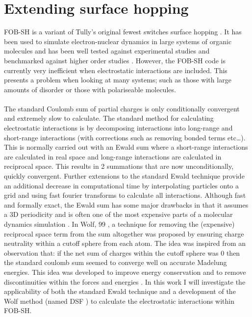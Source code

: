 \chapter{Extending surface hopping}
\label{chap:surface_hopping_ES}

\noindent FOB-SH is a variant of Tully's original fewest switches surface hopping \cite{FSSH_orig}. It has been used to simulate electron-nuclear dynamics in large systems of organic molecules and has been well tested against experimental studies and benchmarked against higher order studies \cite{FlickPolarons, Giannini2018Crossover, Giannini2019,             C9TC05270D, Carof2017FSSH, C9FD00046A, C9CP04770K, FOB-SH_Spencer,        C6FD00107F}. However, the FOB-SH code is currently very inefficient when electrostatic interactions are included. This presents a problem when looking at many systems; such as those with large amounts of disorder or those with polariseable molecules. 
\\\\
The standard Coulomb sum of partial charges is only conditionally convergent and extremely slow to calculate. The standard method for calculating electrostatic interactions is by decomposing interactions into long-range and short-range interactions (with corrections such as removing bonded terms etc\ldots). This is normally carried out with an Ewald sum \cite{Ewald} where a short-range interactions are calculated in real space and long-range interactions are calculated in reciprocal space. This results in 2 summations that are now unconditionally, quickly convergent. Further extensions to the standard Ewald technique provide an additional decrease in computational time by interpolating particles onto a grid and using fast fourier transforms to calculate all interactions. Although fast and formally exact, the Ewald sum has some major drawbacks in that it assumes a 3D periodicity and is often one of the most expensive parts of a molecular dynamics simulation \cite{EwaldReview}. In Wolf, 99 \cite{Wolf99}, a technique for removing the (expensive) reciprocal space term from the sum altogether was proposed by ensuring charge neutrality within a cutoff sphere from each atom. The idea was inspired from an observation that: if the net sum of charges within the cutoff sphere was 0 then the standard coulomb sum seemed to converge well on accurate Madelung energies. This idea was developed to improve energy conservation and to remove discontinuities within the forces and energies \cite{Zahn2002, DSF}. In this work I will investigate the applicability of both the standard Ewald technique and a development of the Wolf method (named DSF \cite{DSF}) to calculate the electrostatic interactions within FOB-SH.
